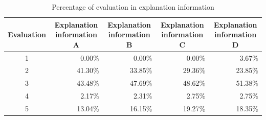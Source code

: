\documentclass[journal]{IAENGtran}
\begin{document}
\begin{table}[t]
  \caption{Percentage of evaluation in explanation information}
  \label{table:Percentage of evaluation in explanation information}
  \centering
  \begin{tabular}{c|r|r|r|r}
  \hline
  Evaluation & \multicolumn{1}{c|}{Explanation information A} & \multicolumn{1}{c|}{Explanation information B} & \multicolumn{1}{c|}{Explanation information C} & \multicolumn{1}{c}{Explanation information D} \\ \hline
  1  & 0.00\%                     & 0.00\%                     & 0.00\%                     & 3.67\%                    \\
  2  & 41.30\%                    & 33.85\%                    & 29.36\%                    & 23.85\%                   \\
  3  & 43.48\%                    & 47.69\%                    & 48.62\%                    & 51.38\%                   \\
  4  & 2.17\%                     & 2.31\%                     & 2.75\%                     & 2.75\%                    \\
  5  & 13.04\%                    & 16.15\%                    & 19.27\%                    & 18.35\%                   \\ \hline
  \end{tabular}
\end{table}
\end{document}
